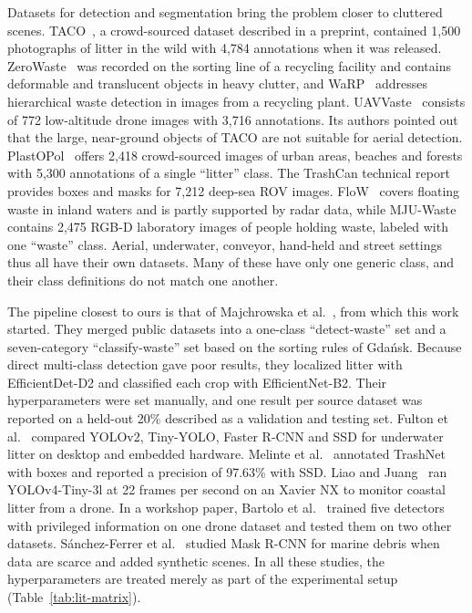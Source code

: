 Datasets for detection and segmentation bring the problem closer to cluttered scenes. TACO~\cite{proenca2020taco}, a crowd-sourced dataset described in a preprint, contained 1,500 photographs of litter in the wild with 4,784 annotations when it was released. ZeroWaste~\cite{bashkirova2022zerowaste} was recorded on the sorting line of a recycling facility and contains deformable and translucent objects in heavy clutter, and WaRP~\cite{yudin2024hierarchical} addresses hierarchical waste detection in images from a recycling plant. UAVVaste~\cite{kraft2021autonomous} consists of 772 low-altitude drone images with 3,716 annotations. Its authors pointed out that the large, near-ground objects of TACO are not suitable for aerial detection. PlastOPol~\cite{cordova2022litter} offers 2,418 crowd-sourced images of urban areas, beaches and forests with 5,300 annotations of a single ``litter'' class. The TrashCan technical report~\cite{hong2020trashcan} provides boxes and masks for 7,212 deep-sea ROV images. FloW~\cite{cheng2021flow} covers floating waste in inland waters and is partly supported by radar data, while MJU-Waste~\cite{wang2020multilevel} contains 2,475 RGB-D laboratory images of people holding waste, labeled with one ``waste'' class. Aerial, underwater, conveyor, hand-held and street settings thus all have their own datasets. Many of these have only one generic class, and their class definitions do not match one another.

The pipeline closest to ours is that of Majchrowska et al.~\cite{majchrowska2022deep}, from which this work started. They merged public datasets into a one-class ``detect-waste'' set and a seven-category ``classify-waste'' set based on the sorting rules of Gda\'{n}sk. Because direct multi-class detection gave poor results, they localized litter with EfficientDet-D2 and classified each crop with EfficientNet-B2. Their hyperparameters were set manually, and one result per source dataset was reported on a held-out 20\% described as a validation and testing set. Fulton et al.~\cite{fulton2019robotic} compared YOLOv2, Tiny-YOLO, Faster R-CNN and SSD for underwater litter on desktop and embedded hardware. Melinte et al.~\cite{melinte2020deep} annotated TrashNet with boxes and reported a precision of 97.63\% with SSD. Liao and Juang~\cite{liao2022realtime} ran YOLOv4-Tiny-3l at 22 frames per second on an Xavier NX to monitor coastal litter from a drone. In a workshop paper, Bartolo et al.~\cite{bartolo2025learning} trained five detectors with privileged information on one drone dataset and tested them on two other datasets. S\'{a}nchez-Ferrer et al.~\cite{sanchezferrer2023experimental} studied Mask R-CNN for marine debris when data are scarce and added synthetic scenes. In all these studies, the hyperparameters are treated merely as part of the experimental setup (Table~\ref{tab:lit-matrix}).

